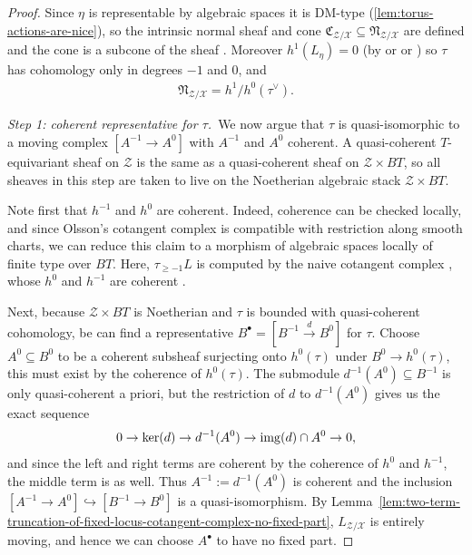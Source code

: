 \begin{proof} 
  Since \(\eta\) is representable by algebraic spaces it is DM-type (\ref{lem:torus-actions-are-nice}), so the intrinsic normal sheaf and cone \(\mathfrak C_{\mathcal Z/\mathcal X}\subseteq \mathfrak N_{\mathcal Z/\mathcal X}\) are defined and the cone is a subcone of the sheaf \cite[Prop. 2.33]{manolache_VirtualPullbacks2012}. Moreover \(h^1(L_\eta) = 0\) (by \cite[Remark 2.3]{manolache_VirtualPullbacks2012} or \cite[Proposition 2.24]{aranha-pstragowski_IntrinsicNormalCone2024} or \cite[Prop. 2.24]{aranha-pstragowski_IntrinsicNormalCone2024}) so \(\tau\) has cohomology only in degrees \(-1\) and \(0\), and
  \begin{align*}
    \mathfrak N_{\mathcal Z/\mathcal X} = h^1/h^0(\tau^\vee).
  \end{align*}

  \bigskip
  
  \noindent\emph{Step 1: coherent representative for \(\tau\).}~We now argue that \(\tau\) is quasi-isomorphic to a moving complex \([A^{-1}\to A^0]\) with \(A^{-1}\) and \(A^0\) coherent. A quasi-coherent \(T\)-equivariant sheaf on \(\mathcal Z\) is the same as a quasi-coherent sheaf on \(\mathcal Z\times BT\), so all sheaves in this step are taken to live on the Noetherian algebraic stack \(\mathcal Z\times BT\).
  
  Note first that \(h^{-1}\) and \(h^0\) are coherent. Indeed, coherence can be checked locally, and since Olsson's cotangent complex is compatible with restriction along smooth charts, we can reduce this claim to a morphism of algebraic spaces locally of finite type over \(BT\). Here, \(\tau_{\geq -1}L\) is computed by the naive cotangent complex \cite[08RB]{stacks-project}, whose \(h^0\) and \(h^{-1}\) are coherent \cite[0D0U]{stacks-project}.

  Next, because \(\mathcal Z\times BT\) is Noetherian and \(\tau\) is bounded with quasi-coherent cohomology, be can find a representative \(B^\bullet = [B^{-1}\xrightarrow{d} B^0]\) for \(\tau\). Choose \(A^0 \subseteq B^0\) to be a coherent subsheaf surjecting onto \(h^0(\tau)\) under \(B^0\to h^0(\tau)\), this must exist by the coherence of \(h^0(\tau)\). The submodule \(d^{-1}(A^0)\subseteq B^{-1}\) is only quasi-coherent a priori, but the restriction of \(d\) to \(d^{-1}(A^0)\) gives us the exact sequence
  \begin{align*}
    0 \to \ker(d) \to d^{-1}(A^0) \to \operatorname{img}(d)\cap A^0 \to 0,
  \end{align*}
  and since the left and right terms are coherent by the coherence of \(h^0\) and \(h^{-1}\), the middle term is as well. Thus \(A^{-1}:= d^{-1}(A^0)\) is coherent and the inclusion \([A^{-1}\to A^0]\hookrightarrow [B^{-1}\to B^0]\) is a quasi-isomorphism. By Lemma~\ref{lem:two-term-truncation-of-fixed-locus-cotangent-complex-no-fixed-part}, \(L_{\mathcal Z/\mathcal X}\) is entirely moving, and hence we can choose \(A^\bullet\) to have no fixed part.


\end{proof}
